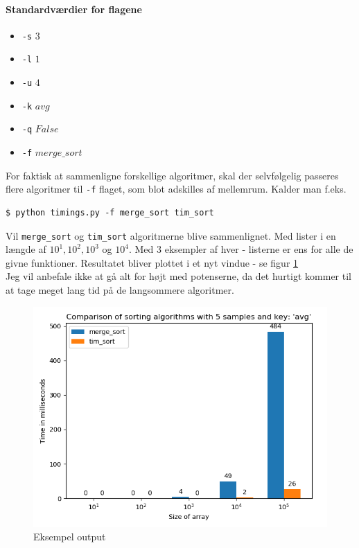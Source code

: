 \documentclass[12pt]{article}
\begin{document}
        \paragraph{Standardværdier for flagene}
        \begin{itemize}
            \item \texttt{-s} $3$
            \item \texttt{-l} $1$
            \item \texttt{-u} $4$
            \item \texttt{-k} $avg$
            \item \texttt{-q} $False$
            \item \texttt{-f} $merge\_sort$
        \end{itemize}
        For faktisk at sammenligne forskellige algoritmer, skal der selvfølgelig passeres flere algoritmer til \texttt{-f} flaget, som blot adskilles af mellemrum.
        \newline
        Kalder man f.eks.
        \begin{verbatim}
$ python timings.py -f merge_sort tim_sort
        \end{verbatim}
        Vil \texttt{merge\_sort} og \texttt{tim\_sort} algoritmerne blive sammenlignet. Med lister i en længde af $10^1, 10^2, 10^3$ og $10^4$. Med $3$ eksempler af hver - listerne er ens for alle de givne funktioner.
        Resultatet bliver plottet i et nyt vindue - se figur \ref{fig:figur1}\\
        Jeg vil anbefale ikke at gå alt for højt med potenserne, da det hurtigt kommer til at tage meget lang tid på de langsommere algoritmer.


        \begin{figure}[htpb!]
            \center
            \includegraphics[width=.6\linewidth]{figur1.png}
            \caption{Eksempel output}
            \label{fig:figur1}
        \end{figure}
\end{document}
